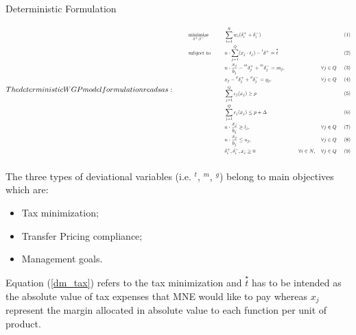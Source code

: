 \documentclass[10pt]{beamer}
\begin{document}
\begin{frame}[allowframebreaks]{Deterministic Formulation}
  \begin{subequations}
    The deterministic WGP model formulation reads as:
    
\scalebox{0.7}{\parbox{1\linewidth}{%
\begin{align}
    & \underset{\delta^+,\delta^-}{\text{minimize}} & & \sum^{N}_{i=1}w_i(\delta^+_i + \delta^-_i) & \label{dm_obj} \\
    & \text{subject to} & & n\cdot \sum^{Q}_{j=1}(x_j\cdot t_j) - \prescript{t}{}{\delta^+}  =\overset{\star}{t} & \label{dm_tax} \\
    & & & n\cdot \frac{x_j}{b_j} - \prescript{m}{}{\delta^+_j} + \prescript{m}{}{\delta^-_j} = m_j, & \forall j \in Q \label{dm_median} \\
    & & & {x_j} - \prescript{g}{}{\delta^+_j} + \prescript{g}{}{\delta^-_j} = g_j, & \forall j \in Q \label{dm_management} \\
    & & & \sum^{Q}_{j=1} c_j(x_j) \geq p & \label{p_l} \\ 
    & & & \sum^{Q}_{j=1} c_j(x_j) \leq p + \Delta & \label{p_u} \\
    & & & n\cdot \frac{x_j}{b_j} \geq l_j, & \forall j \in Q \label{l_q} \\
    & & & n\cdot \frac{x_j}{b_j} \leq u_j, & \forall j \in Q \label{up_q}\\
    & & & \delta^+_i,\delta^-_i,x_j\geq 0  & \forall i \in N, \quad \forall j \in Q
\end{align}
}}
\end{subequations}

\pagebreak

The three types of deviational variables (i.e. \(^t\),
\(^m\), \(^g\)) belong to main objectives which are:

\begin{itemize}
\item Tax minimization;
\item Transfer Pricing compliance;
\item Management goals.
\end{itemize}

Equation (\ref{dm_tax}) refers to the tax minimization and $\overset{\star}{t}$ has to be intended as the absolute value of tax expenses that MNE would like to pay whereas $x_j$ represent the margin allocated in absolute value to each function per unit of product.


\end{frame}
\end{document}
